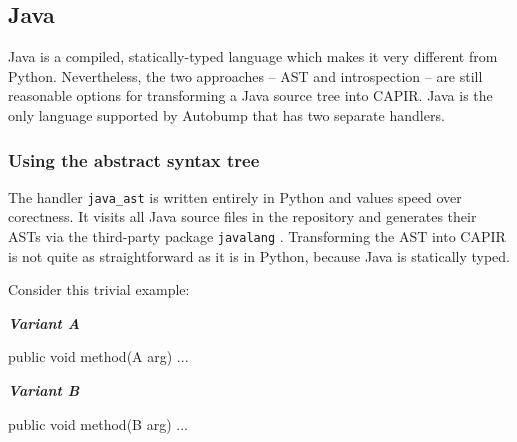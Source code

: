 \documentclass{l4proj}
\newenvironment{halfmini}[1]
{
\begin{minipage}[t]{0.5\textwidth}
\noindent\textbf{\textit{#1}}\\
}
{
\end{minipage}
}
\newcommand\genericstyle{\lstset{basicstyle=\ttm}}
\newcommand\codeinline[1]{{\genericstyle\lstinline!#1!}}
\begin{document}
\subsection{Java}
\label{JavaHandlers}

Java is a compiled, statically-typed language which makes it very
different from Python. Nevertheless, the two approaches -- AST
and introspection -- are still reasonable options for transforming a
Java source tree into CAPIR. Java is the only language supported by
Autobump that has two separate handlers.

\subsubsection{Using the abstract syntax tree}

The handler \codeinline{java_ast} is written entirely in Python and
values speed over corectness. It visits all Java source files in the
repository and generates their ASTs via the third-party package
\codeinline{javalang} \cite{Javalang}. Transforming the AST into CAPIR
is not quite as straightforward as it is in Python, because Java is
statically typed.

Consider this trivial example:

\begin{halfmini}{Variant A}
\begin{java}
public void method(A arg) { ... }
\end{java}
\end{halfmini}
\begin{halfmini}{Variant B}
\begin{java}
public void method(B arg) { ... }
\end{java}
\end{halfmini}
\end{document}
